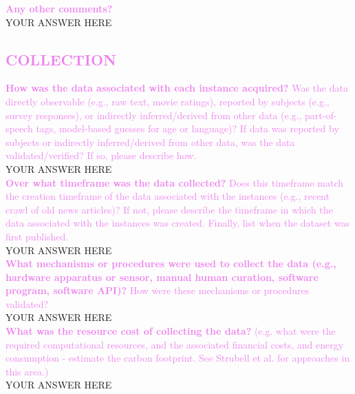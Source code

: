 \documentclass[letterpaper, 10 pt, conference]{ieeeconf}  %
\newcommand{\sectioncolor}{violet}
\begin{document}
    \textcolor{\sectioncolor}{\textbf{
    Any other comments?
    }} \\
    YOUR ANSWER HERE \\

\begin{mdframed}[linecolor=\sectioncolor]
\section*{\textcolor{\sectioncolor}{
    COLLECTION
}}
\end{mdframed}

    \textcolor{\sectioncolor}{\textbf{
    How was the data associated with each instance acquired?
    }
    Was the data directly observable (e.g., raw text, movie ratings),
    reported by subjects (e.g., survey responses), or indirectly
    inferred/derived from other data (e.g., part-of-speech tags, model-based
    guesses for age or language)? If data was reported by subjects or
    indirectly inferred/derived from other data, was the data
    validated/verified? If so, please describe how.
    } \\
    YOUR ANSWER HERE \\
    
    \textcolor{\sectioncolor}{\textbf{
    Over what timeframe was the data collected?
    }
    Does this timeframe match the creation timeframe of the data associated
    with the instances (e.g., recent crawl of old news articles)? If not,
    please describe the timeframe in which the data associated with the
    instances was created. Finally, list when the dataset was first published.
    } \\
    YOUR ANSWER HERE \\
    
    \textcolor{\sectioncolor}{\textbf{
    What mechanisms or procedures were used to collect the data (e.g., hardware
    apparatus or sensor, manual human curation, software program, software
    API)?
    }
    How were these mechanisms or procedures validated?
    } \\
    YOUR ANSWER HERE \\
    
    \textcolor{\sectioncolor}{\textbf{
    What was the resource cost of collecting the data?
    }
    (e.g. what were the required computational resources, and the associated
    financial costs, and energy consumption - estimate the carbon footprint.
    See Strubell et al. for approaches in this area.)
    } \\
    YOUR ANSWER HERE \\
    
\end{document}
